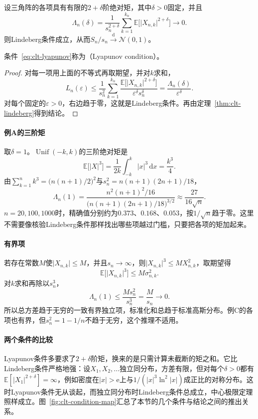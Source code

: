 \begin{theorem}[Lyapunov中心极限定理]
\label{thm:clt-lyapunov}
设三角阵的各项具有有限的$2+\delta$阶绝对矩，其中$\delta>0$固定，并且
\begin{equation}
 \Lambda_n(\delta)=\frac{1}{s_n^{2+\delta}}\sum_{k=1}^{k_n}\mathbb{E}\bigl[\lvert X_{n,k}\rvert^{2+\delta}\bigr]\to0 .
 \label{eq:clt-lyapunov}
\end{equation}
则Lindeberg条件成立，从而$S_n/s_n\xrightarrow{\mathrm{d}}\mathcal{N}(0,1)$。
\end{theorem}

条件~\eqref{eq:clt-lyapunov}称为（Lyapunov condition）。

\begin{proof}
对每一项用上面的不等式再取期望，并对$k$求和，
\[
 L_n(\varepsilon)\leq\frac{1}{s_n^2}\sum_{k=1}^{k_n}\frac{\mathbb{E}\bigl[\lvert X_{n,k}\rvert^{2+\delta}\bigr]}{\varepsilon^{\delta}s_n^{\delta}}=\frac{\Lambda_n(\delta)}{\varepsilon^{\delta}} .
\]
对每个固定的$\varepsilon>0$，右边趋于零，这就是Lindeberg条件。再由定理~\ref{thm:clt-lindeberg}得到结论。
\end{proof}

\paragraph{例A的三阶矩}
取$\delta=1$。$\operatorname{Unif}(-k,k)$的三阶绝对矩是
\[
 \mathbb{E}\bigl[\lvert X\rvert^{3}\bigr]=\frac{1}{2k}\int_{-k}^{k}\lvert x\rvert^{3}\,\mathrm{d}x=\frac{k^3}{4} .
\]
由$\sum_{k=1}^{n}k^3=\bigl(n(n+1)/2\bigr)^2$与$s_n^2=n(n+1)(2n+1)/18$，
\[
 \Lambda_n(1)=\frac{n^2(n+1)^2/16}{\bigl(n(n+1)(2n+1)/18\bigr)^{3/2}}\approx\frac{27}{16\sqrt{n}} .
\]
$n=20,100,1000$时，精确值分别约为$0.373$、$0.168$、$0.053$，按$1/\sqrt{n}$趋于零。这里不需要像核验Lindeberg条件那样找出哪些项越过门槛，只要把各项的矩加起来。

\paragraph{有界项}
若存在常数$M$使$\lvert X_{n,k}\rvert\leq M$，并且$s_n\to\infty$，则$\lvert X_{n,k}\rvert^3\leq MX_{n,k}^2$，取期望得
\[
 \mathbb{E}\bigl[\lvert X_{n,k}\rvert^{3}\bigr]\leq M\sigma_{n,k}^2 .
\]
对$k$求和再除以$s_n^3$，
\[
 \Lambda_n(1)\leq\frac{M s_n^2}{s_n^3}=\frac{M}{s_n}\to0 .
\]
所以总方差趋于无穷的一致有界独立项，标准化和总趋于标准高斯分布。例C的各项也有界，但$s_n^2=1-1/n$不趋于无穷，这个推理不适用。

\paragraph{两个条件的比较}
Lyapunov条件多要求了$2+\delta$阶矩，换来的是只需计算未截断的矩之和。它比Lindeberg条件严格地强：设$X_1,X_2,\dots$独立同分布，方差有限，但对每个$\delta>0$都有$\mathbb{E}[\lvert X_1\rvert^{2+\delta}]=\infty$，例如密度在$\lvert x\rvert>\mathrm{e}$上与$1/(\lvert x\rvert^3\ln^2\lvert x\rvert)$成正比的对称分布。这时Lyapunov条件无从谈起，而独立同分布时Lindeberg条件总成立，中心极限定理照样成立。图~\ref{fig:clt-condition-map}汇总了本节的几个条件与结论之间的推出关系。

